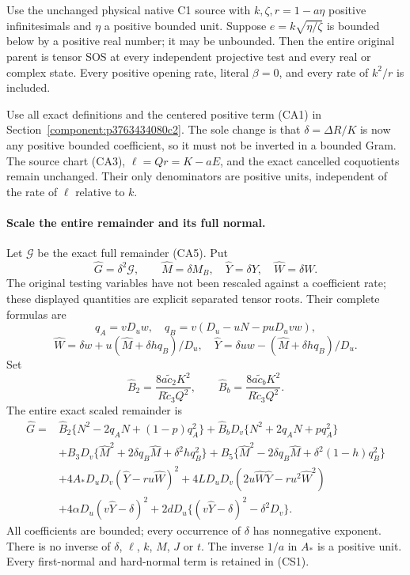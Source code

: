 \label{component:pccaa793fd0bf}

\begin{theorem}
Use the unchanged physical native C1 source with $k,\zeta,r=1-a\eta$
positive infinitesimals and $\eta$ a positive bounded unit. Suppose
$e=k\sqrt{\eta/\zeta}$ is bounded below by a positive real number;
it may be unbounded. Then the entire original parent is tensor SOS at
every independent projective test and every real or complex state.
Every positive opening rate, literal $\beta=0$, and every rate of
$k^2/r$ is included.
\end{theorem}

Use all exact definitions and the centered positive term (CA1) in
Section~\ref{component:p3763434080c2}. The sole change is that
$\delta=\Delta R/K$ is now any positive bounded coefficient, so it
must not be inverted in a bounded Gram. The source chart (CA3),
$\ell=Qr=K-aE$, and the exact cancelled coquotients remain unchanged.
Their only denominators are positive units, independent of the rate
of $\ell$ relative to $k$.

\paragraph{Scale the entire remainder and its full normal.}
Let $\mathscr G$ be the exact full remainder (CA5). Put
\[
 \widehat G=\delta^2\mathscr G,\qquad
 \widehat M=\delta M_B,\quad \widehat Y=\delta Y,
 \quad\widehat W=\delta W.
\]
The original testing variables have not been rescaled against a
coefficient rate; these displayed quantities are explicit separated
tensor roots. Their complete formulas are
\[
 q_A=vD_uw,\quad q_B=v(D_u-uN-puD_uv w),
\]
\[
 \widehat W=\delta w+u(\widehat M+\delta hq_B)/D_u,
 \quad\widehat Y=\delta uw-(\widehat M+\delta hq_B)/D_u.
\]
Set
\[
 \widehat B_2=\frac{8a\widetilde c_2K^2}{R\widetilde c_3Q^2},
 \qquad
 \widehat B_b=\frac{8a\widetilde c_bK^2}{R\widetilde c_3Q^2}.
\]
The entire exact scaled remainder is
\begin{align*}
\widehat G={}&\widehat B_2\{N^2-2q_AN+(1-p)q_A^2\}
 +\widehat B_bD_v\{N^2+2q_AN+pq_A^2\}\\
&+B_3D_v\{\widehat M^2+2\delta q_B\widehat M+\delta^2hq_B^2\}
 +B_5\{\widehat M^2-2\delta q_B\widehat M+\delta^2(1-h)q_B^2\}\\
&+4A_*D_uD_v(\widehat Y-r u\widehat W)^2
 +4LD_uD_v(2u\widehat W\widehat Y-r u^2\widehat W^2)\\
&+4\alpha D_u(v\widehat Y-\delta)^2
 +2dD_u\{(v\widehat Y-\delta)^2-\delta^2D_v\}.
 \tag{CS1}
\end{align*}
All coefficients are bounded; every occurrence of $\delta$ has
nonnegative exponent. There is no inverse of $\delta$, $\ell$, $k$,
$M$, $J$ or $t$. The inverse $1/a$ in $A_*$ is a positive unit.
Every first-normal and hard-normal term is retained in (CS1).

